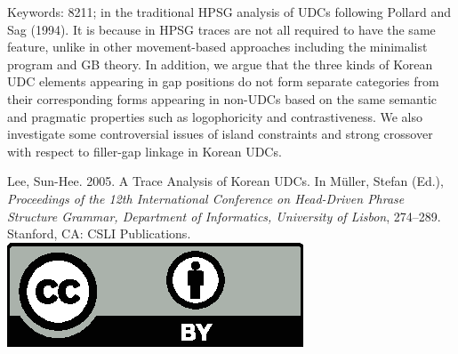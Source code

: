 \documentclass[11pt,a4paper,fleqn]{article}
\begin{document}
\noindent
Keywords: 8211; in the traditional HPSG analysis of
UDCs following Pollard and Sag (1994). It is because in HPSG traces 
are not all required to have the same feature, unlike in other
movement-based approaches including the minimalist program and GB
theory. In addition, we argue that the three kinds of Korean UDC
elements appearing in gap positions do not form separate categories
from their corresponding forms appearing in non-UDCs based on the
same semantic and pragmatic properties such as logophoricity and
contrastiveness. We also investigate some controversial issues of
island constraints and strong crossover with respect to filler-gap
linkage in Korean UDCs.


\vfill
\noindent
Lee, Sun-Hee. 2005. A Trace Analysis of Korean UDCs. In Müller, Stefan (Ed.), \emph{{Proceedings of the 12th International Conference on Head-Driven Phrase Structure Grammar, Department of Informatics, University of Lisbon}}, 274--289. Stanford,
CA: CSLI Publications. \hfill\href{http://creativecommons.org/licenses/by/4.0/}{\includegraphics[height=.75em]{Includes/ccby.eps}}

\newpage

        \setcounter{page}{290}
\thispagestyle{empty}
\end{document}
